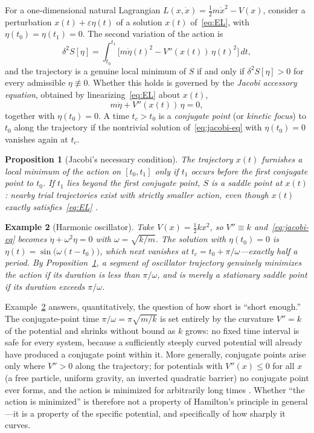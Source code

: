 \documentclass[11pt]{article}
\newtheorem{proposition}{Proposition}[section]
\newtheorem{example}[proposition]{Example}
\begin{document}
For a one-dimensional natural Lagrangian $L(x,\dot x) = \tfrac12 m\dot x^2 - V(x)$, consider a perturbation $x(t)+\varepsilon\eta(t)$ of a solution $x(t)$ of~\eqref{eq:EL}, with $\eta(t_0)=\eta(t_1)=0$. The second variation of the action is
\begin{equation}
\delta^2 S[\eta] = \int_{t_0}^{t_1} \Big[ m\dot\eta(t)^2 - V''(x(t))\,\eta(t)^2 \Big]\, dt ,
\end{equation}
and the trajectory is a genuine local minimum of $S$ if and only if $\delta^2S[\eta]>0$ for every admissible $\eta\not\equiv0$. Whether this holds is governed by the \emph{Jacobi accessory equation}, obtained by linearizing~\eqref{eq:EL} about $x(t)$,
\begin{equation}
\label{eq:jacobi-eq}
m\ddot\eta + V''(x(t))\,\eta = 0 ,
\end{equation}
together with $\eta(t_0)=0$. A time $t_c>t_0$ is a \emph{conjugate point} (or \emph{kinetic focus}) to $t_0$ along the trajectory if the nontrivial solution of~\eqref{eq:jacobi-eq} with $\eta(t_0)=0$ vanishes again at $t_c$.

\begin{proposition}[Jacobi's necessary condition]
\label{prop:jacobi-necessary}
The trajectory $x(t)$ furnishes a local minimum of the action on $[t_0,t_1]$ only if $t_1$ occurs before the first conjugate point to $t_0$. If $t_1$ lies beyond the first conjugate point, $S$ is a saddle point at $x(t)$: nearby trial trajectories exist with strictly smaller action, even though $x(t)$ exactly satisfies~\eqref{eq:EL} \citep{gelfandfomin1963,gray2009}.
\end{proposition}

\begin{example}[Harmonic oscillator]
\label{ex:sho}
Take $V(x)=\tfrac12 kx^2$, so $V''\equiv k$ and~\eqref{eq:jacobi-eq} becomes $\ddot\eta+\omega^2\eta=0$ with $\omega=\sqrt{k/m}$. The solution with $\eta(t_0)=0$ is $\eta(t)=\sin\!\big(\omega(t-t_0)\big)$, which next vanishes at $t_c=t_0+\pi/\omega$---exactly half a period. By Proposition~\ref{prop:jacobi-necessary}, a segment of oscillator trajectory genuinely minimizes the action if its duration is less than $\pi/\omega$, and is merely a stationary saddle point if its duration exceeds $\pi/\omega$.
\end{example}

Example~\ref{ex:sho} answers, quantitatively, the question of how short is ``short enough.'' The conjugate-point time $\pi/\omega=\pi\sqrt{m/k}$ is set entirely by the curvature $V''=k$ of the potential and shrinks without bound as $k$ grows: no fixed time interval is safe for every system, because a sufficiently steeply curved potential will already have produced a conjugate point within it. More generally, conjugate points arise only where $V''>0$ along the trajectory; for potentials with $V''(x)\leq 0$ for all $x$ (a free particle, uniform gravity, an inverted quadratic barrier) no conjugate point ever forms, and the action is minimized for arbitrarily long times \citep{gray2009}. Whether ``the action is minimized'' is therefore not a property of Hamilton's principle in general---it is a property of the specific potential, and specifically of how sharply it curves.
\end{document}
